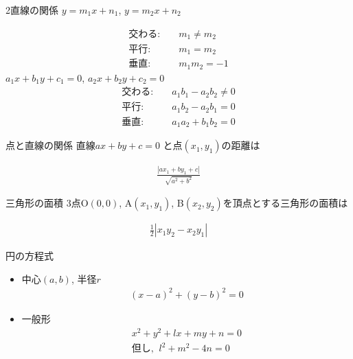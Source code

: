 \documentclass[aspectratio=169, 12pt]{beamer} %
\begin{document}
\begin{frame}{2直線の関係}
    $y=m_1x+n_1$, $y=m_2x+n_2$ \par
    \begin{eqnarray*}
        \text{交わる: }&&m_1\neq m_2 \\
        \text{平行: }&&m_1= m_2 \\
        \text{垂直: }&&m_1m_2=-1
    \end{eqnarray*}
    $a_1x+b_1y+c_1=0$, $a_2x+b_2y+c_2=0$
    \begin{eqnarray*}
        \text{交わる: }&& a_1b_1-a_2b_2\neq0 \\
        \text{平行: }&& a_1b_2-a_2b_1=0 \\
        \text{垂直: }&& a_1a_2+b_1b_2=0
    \end{eqnarray*}
\end{frame}
\begin{frame}{点と直線の関係}
    直線$ax+by+c=0$ と点$(x_1,y_1)$の距離は\par
    \begin{eqnarray*}
        \frac{|ax_1+by_1+c|}{\sqrt{a^2+b^2}}
    \end{eqnarray*}
\end{frame}
\begin{frame}{三角形の面積}
    3点O$(0,0)$, A$(x_1, y_1)$, B$(x_2,y_2)$を頂点とする三角形の面積は\par
    \begin{eqnarray*}
        \frac{1}{2}|x_1y_2-x_2y_1|
    \end{eqnarray*}
\end{frame}
\begin{frame}{円の方程式}
    \begin{itemize}
        \item 中心$(a,b)$, 半径$r$
              \begin{eqnarray*}
                  (x-a)^2+(y-b)^2=0
              \end{eqnarray*}
        \item 一般形
              \begin{eqnarray*}
                  x^2+y^2+lx+my+n=0 \\
                  \text{但し,}\;\; l^2+m^2-4n=0
              \end{eqnarray*}
    \end{itemize}
\end{frame}
\end{document}
